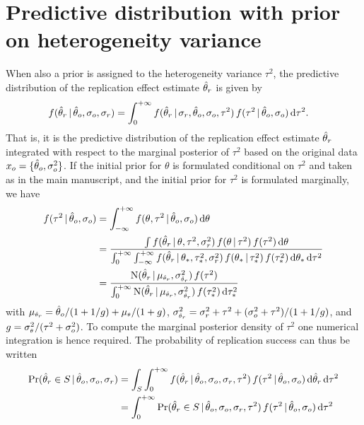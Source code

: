 \documentclass[a4paper, 11pt]{article}
\begin{document}
\section{Predictive distribution with prior on heterogeneity variance}
When also a prior is assigned to the heterogeneity variance $\tau^{2}$, the
predictive distribution of the replication effect estimate $\hat{\theta}_{r}$ is given
by
\begin{align*}
  f(\hat{\theta}_{r} \,\vert\, \hat{\theta}_{o}, \sigma_{o}, \sigma_{r})
  &= \int_{0}^{+\infty} f(\hat{\theta}_{r} \,\vert\, \sigma_{r}, \hat{\theta}_{o}, \sigma_{o},
    \tau^{2}) \,
    f(\tau^{2} \,\vert\, \hat{\theta}_{o}, \sigma_{o}) \, \text{d}\tau^{2}.
\end{align*}
That is, it is the predictive distribution of the replication effect estimate
$\hat{\theta}_{r}$ integrated with respect to the marginal posterior of $\tau^{2}$
based on the original data $x_{o} = \{\hat{\theta}_{o}, \sigma^{2}_{o}\}$. If the
initial prior for $\theta$ is formulated conditional on $\tau^{2}$ and taken as
in the main manuscript, and the initial prior for $\tau^{2}$ is formulated
marginally, we have
\begin{align*}
  f(\tau^{2} \,\vert\, \hat{\theta}_{o}, \sigma_{o})
  &= \int_{-\infty}^{+\infty} f(\theta, \tau^{2} \,\vert\, \hat{\theta}_{o}, \sigma_{o}) \, \text{d}\theta \\
  &= \frac{\int f(\hat{\theta}_{r} \,\vert\, \theta, \tau^{2}, \sigma^{2}_{r}) \,
    f(\theta \,\vert\, \tau^{2}) \, f(\tau^{2}) \, \text{d}\theta}{\int_{0}^{+\infty}
    \int_{-\infty}^{+\infty} f(\hat{\theta}_{r} \,\vert\, \theta_{*}, \tau^{2}_{*}, \sigma^{2}_{r}) \,
    f(\theta_{*} \,\vert\, \tau^{2}_{*}) \, f(\tau^{2}_{*}) \, \text{d}\theta_{*} \,
    \text{d}\tau^{2}} \\
  &=  \frac{\operatorname{N}(\hat{\theta}_{r} \,\vert\, \mu_{\scriptscriptstyle \hat{\theta}_{r}}, \sigma_{\scriptscriptstyle \hat{\theta}_{r}}^{2}) \,
    f(\tau^{2})}{\int_{0}^{+\infty} \operatorname{N}(\hat{\theta}_{r} \,\vert\, \mu_{\scriptscriptstyle \hat{\theta}_{r}}, \sigma_{\scriptscriptstyle \hat{\theta}_{r}}^{2})
    \, f(\tau^{2}_{*}) \, \text{d}\tau^{2}_{*}}
\end{align*}
with $\mu_{\scriptscriptstyle \hat{\theta}_{r}} = \hat{\theta}_o/(1 + 1/g) + \mu_{\scriptscriptstyle \theta}/(1 + g)$,
$\sigma_{\scriptscriptstyle \hat{\theta}_{r}}^{2} = \sigma^2_r + \tau^2 + (\sigma^2_o + \tau^2)/(1 + 1/g)$, and
$g = \sigma_{\scriptscriptstyle \theta}^{2}/(\tau^{2} + \sigma^{2}_{o})$. To compute the marginal
posterior density of $\tau^{2}$ one numerical integration is hence required. The
probability of replication success can thus be written
\begin{align*}
  \Pr(\hat{\theta}_{r} \in S \,\vert\, \hat{\theta}_{o}, \sigma_{o}, \sigma_{r})
  &= \int_{S}\int_{0}^{+\infty} f(\hat{\theta}_{r} \,\vert\, \hat{\theta}_{o}, \sigma_{o}, \sigma_{r}, \tau^{2}) \,
    f(\tau^{2} \,\vert\, \hat{\theta}_{o}, \sigma_{o}) \, \text{d}\hat{\theta}_{r} \,\text{d}\tau^{2} \\
  &= \int_{0}^{+\infty} \Pr(\hat{\theta}_{r} \in S \,\vert\, \hat{\theta}_{o}, \sigma_{o}, \sigma_{r}, \tau^{2}) \,
    f(\tau^{2} \,\vert\, \hat{\theta}_{o}, \sigma_{o}) \, \text{d}\tau^{2} \\
\end{align*}
\end{document}
